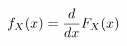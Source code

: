 \documentclass[preview]{standalone}
\begin{document}
\begin{align*}
\special{dvisvgm:raw <g id='unique000'>}f_X(x)=\frac{d}{dx}F_X(x)\special{dvisvgm:raw </g>}
\end{align*}
\end{document}
